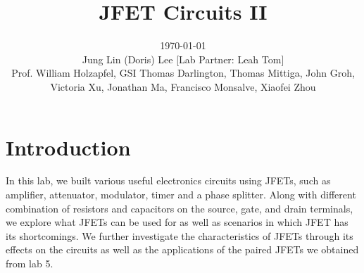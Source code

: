 \documentclass[authoryear, 12pt,5p, times]{elsarticle}
\begin{document}
\begin{frontmatter}
\title{JFET Circuits II}
\author{\today \quad \\Jung Lin (Doris) Lee [Lab Partner: Leah Tom]\\Prof. William Holzapfel, GSI Thomas Darlington, Thomas Mittiga, John Groh,  \\Victoria Xu, Jonathan Ma, Francisco Monsalve, Xiaofei Zhou\vspace{-30pt}}	 
\end{frontmatter}
\section*{Introduction\label{intro}}
In this lab, we built various useful electronics circuits using JFETs, such as amplifier, attenuator, modulator, timer and a phase splitter. Along with different combination of resistors and capacitors on the source, gate, and drain terminals, we explore what JFETs can be used for as well as scenarios in which JFET has its shortcomings.  We further investigate the characteristics of JFETs through its effects on the circuits as well as the applications of the paired JFETs we obtained from lab 5.
\end{document}

